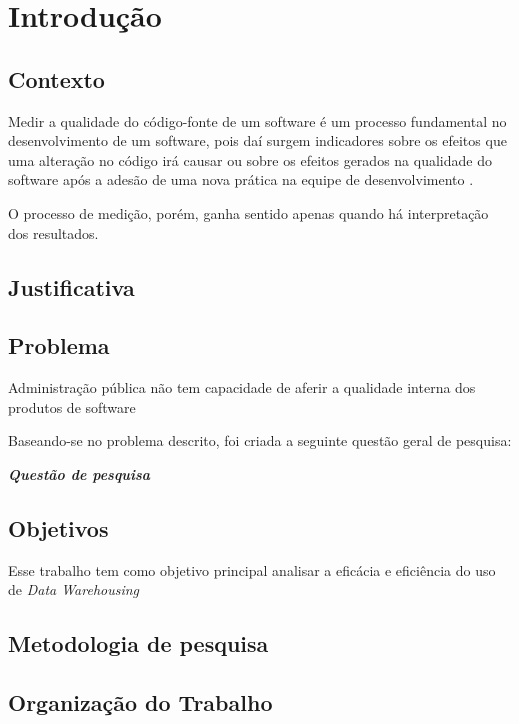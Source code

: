 \chapter{Introdução}

\section{Contexto}

Medir a qualidade do código-fonte  de um software é um processo fundamental no desenvolvimento de um software, pois daí surgem indicadores sobre os efeitos que uma alteração no código irá causar ou sobre os efeitos gerados na qualidade do software após a adesão de uma nova prática na equipe de desenvolvimento \cite{Fenton98}.

O processo de medição, porém, ganha sentido apenas quando há interpretação dos resultados.


\section{Justificativa}

\section{Problema}

Administração pública não tem capacidade de aferir a qualidade interna dos produtos de software



Baseando-se no problema descrito, foi criada a seguinte questão geral de pesquisa:

\textbf{\textit{Questão de pesquisa }}

\section{Objetivos}

Esse trabalho tem como objetivo principal analisar a eficácia e eficiência do uso de \textit{Data Warehousing} 


\section{Metodologia de pesquisa}

\section{Organização do Trabalho}

